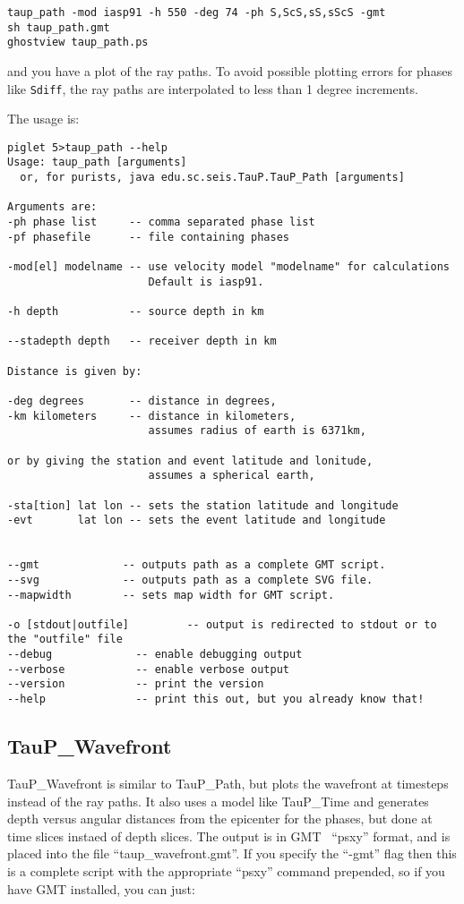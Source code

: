 \begin{verbatim}
taup_path -mod iasp91 -h 550 -deg 74 -ph S,ScS,sS,sScS -gmt
sh taup_path.gmt
ghostview taup_path.ps
\end{verbatim}

and you have a plot of the ray paths. To avoid possible plotting errors for
phases like \texttt{Sdiff}, the ray paths are interpolated to less than 
1 degree increments.

The usage is:
\begin{verbatim}
piglet 5>taup_path --help
Usage: taup_path [arguments]
  or, for purists, java edu.sc.seis.TauP.TauP_Path [arguments]

Arguments are:
-ph phase list     -- comma separated phase list
-pf phasefile      -- file containing phases

-mod[el] modelname -- use velocity model "modelname" for calculations
                      Default is iasp91.

-h depth           -- source depth in km

--stadepth depth   -- receiver depth in km

Distance is given by:

-deg degrees       -- distance in degrees,
-km kilometers     -- distance in kilometers,
                      assumes radius of earth is 6371km,

or by giving the station and event latitude and lonitude,
                      assumes a spherical earth,

-sta[tion] lat lon -- sets the station latitude and longitude
-evt       lat lon -- sets the event latitude and longitude


--gmt             -- outputs path as a complete GMT script.
--svg             -- outputs path as a complete SVG file.
--mapwidth        -- sets map width for GMT script.

-o [stdout|outfile]         -- output is redirected to stdout or to the "outfile" file
--debug             -- enable debugging output
--verbose           -- enable verbose output
--version           -- print the version
--help              -- print this out, but you already know that!
\end{verbatim} 

\subsection{TauP\_Wavefront}
TauP\_Wavefront is similar to TauP\_Path, but plots the wavefront at timesteps instead of the
ray paths. It also uses a model like TauP\_Time and
generates  depth versus
angular distances from the epicenter for the phases, but done at time slices instaed of depth slices. 
The output is in GMT~\cite{GMT} ``psxy'' format, and is
placed into the file ``taup\_wavefront.gmt''. 
If you specify the ``-gmt'' flag then this 
is a complete script with the appropriate ``psxy'' command prepended, so if you
have GMT installed, you can just:

